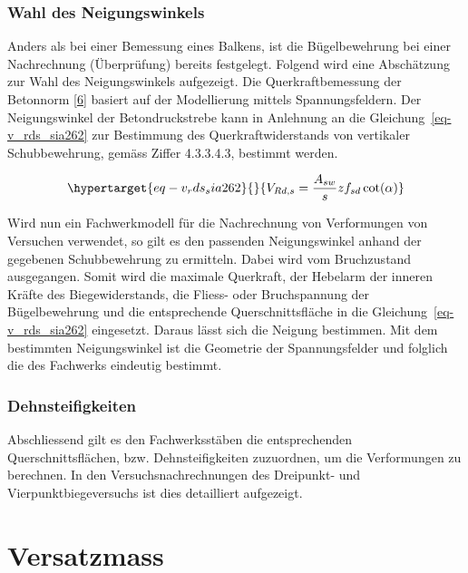 \documentclass[
  12pt,
  letterpaper,
  egregdoesnotlikesansseriftitles]{scrreprt}
\begin{document}
\hypertarget{wahl-des-neigungswinkels}{%
\subsubsection{Wahl des
Neigungswinkels}\label{wahl-des-neigungswinkels}}

Anders als bei einer Bemessung eines Balkens, ist die Bügelbewehrung bei
einer Nachrechnung (Überprüfung) bereits festgelegt. Folgend wird eine
Abschätzung zur Wahl des Neigungswinkels aufgezeigt. Die
Querkraftbemessung der Betonnorm
{[}\protect\hyperlink{ref-SIA2013a}{6}{]} basiert auf der Modellierung
mittels Spannungsfeldern. Der Neigungswinkel der Betondruckstrebe kann
in Anlehnung an die Gleichung~\ref{eq-v_rds_sia262} zur Bestimmung des
Querkraftwiderstands von vertikaler Schubbewehrung, gemäss Ziffer
4.3.3.4.3, bestimmt werden.

\begin{equation}\protect\hypertarget{eq-v_rds_sia262}{}{
V_{Rd,s} = \frac{A_{sw}}{s} z f_{sd} \cot(\alpha)
}\label{eq-v_rds_sia262}\end{equation}

Wird nun ein Fachwerkmodell für die Nachrechnung von Verformungen von
Versuchen verwendet, so gilt es den passenden Neigungswinkel anhand der
gegebenen Schubbewehrung zu ermitteln. Dabei wird vom Bruchzustand
ausgegangen. Somit wird die maximale Querkraft, der Hebelarm der inneren
Kräfte des Biegewiderstands, die Fliess- oder Bruchspannung der
Bügelbewehrung und die entsprechende Querschnittsfläche in die
Gleichung~\ref{eq-v_rds_sia262} eingesetzt. Daraus lässt sich die
Neigung bestimmen. Mit dem bestimmten Neigungswinkel ist die Geometrie
der Spannungsfelder und folglich die des Fachwerks eindeutig bestimmt.

\hypertarget{dehnsteifigkeiten}{%
\subsubsection{Dehnsteifigkeiten}\label{dehnsteifigkeiten}}

Abschliessend gilt es den Fachwerksstäben die entsprechenden
Querschnittsflächen, bzw. Dehnsteifigkeiten zuzuordnen, um die
Verformungen zu berechnen. In den Versuchsnachrechnungen des Dreipunkt-
und Vierpunktbiegeversuchs ist dies detailliert aufgezeigt.

\hypertarget{sec-versatzmass}{%
\section{Versatzmass}\label{sec-versatzmass}}
\end{document}
